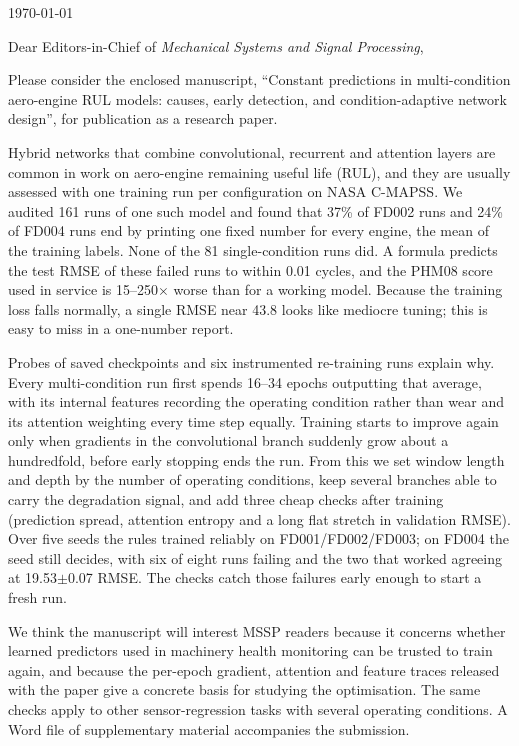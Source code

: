 \documentclass[11pt]{article}
\begin{document}
\begin{flushright}
\today
\end{flushright}

\bigskip
Dear Editors-in-Chief of \textit{Mechanical Systems and Signal Processing},

\medskip
Please consider the enclosed manuscript, ``Constant predictions in
multi-condition aero-engine RUL models: causes, early detection, and
condition-adaptive network design'', for publication as a research paper.

Hybrid networks that combine convolutional, recurrent and attention layers
are common in work on aero-engine remaining useful life (RUL), and they are
usually assessed with one training run per configuration on NASA C-MAPSS.
We audited 161 runs of one such model and found that 37\% of FD002 runs and
24\% of FD004 runs end by printing one fixed number for every engine, the
mean of the training labels. None of the 81 single-condition runs did. A
formula predicts the test RMSE of these failed runs to within 0.01 cycles,
and the PHM08 score used in service is 15--250$\times$ worse than for a
working model. Because the training loss falls normally, a single RMSE near
43.8 looks like mediocre tuning; this is easy to miss in a one-number report.

Probes of saved checkpoints and six instrumented re-training runs explain
why. Every multi-condition run first spends 16--34 epochs outputting that
average, with its internal features recording the operating condition rather
than wear and its attention weighting every time step equally. Training
starts to improve again only when gradients in the convolutional branch
suddenly grow about a hundredfold, before early stopping ends the run. From
this we set window length and depth by the number of operating conditions,
keep several branches able to carry the degradation signal, and add three
cheap checks after training (prediction spread, attention entropy and a long
flat stretch in validation RMSE). Over five seeds the rules trained
reliably on FD001/FD002/FD003; on FD004 the seed still decides, with six of
eight runs failing and the two that worked agreeing at 19.53$\pm$0.07 RMSE.
The checks catch those failures early enough to start a fresh run.

We think the manuscript will interest MSSP readers because it concerns
whether learned predictors used in machinery health monitoring can be
trusted to train again, and because the per-epoch gradient, attention and
feature traces released with the paper give a concrete basis for studying
the optimisation. The same checks apply to other sensor-regression tasks
with several operating conditions. A Word file of supplementary material
accompanies the submission.
\end{document}
